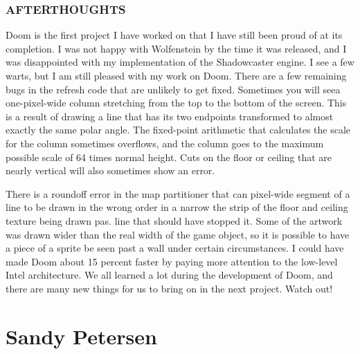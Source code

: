 \subsubsection{AFTERTHOUGHTS}
Doom is the first project I have worked on that I have still been proud of at its completion. I was not happy with Wolfenstein by the time it was released, and I was disappointed with my implementation of the Shadowcaster engine. I see a few warts, but I am still pleased with my work on Doom. There are a few remaining bugs in the refresh code that are unlikely to get fixed. Sometimes you will seea one-pixel-wide column stretching from the top to the bottom of the screen. This is a result of drawing a line that has its two endpoints transformed to almost exactly the same polar angle. The fixed-point arithmetic that calculates the scale for the column sometimes overflows, and the column goes to the maximum possible scale of 64 times normal height. Cuts on the floor or ceiling that are nearly vertical will also sometimes show an error.\\
\par

There is a roundoff error in the map partitioner that can pixel-wide segment of a line to be drawn in the wrong order in a narrow the strip of the floor and ceiling texture being drawn pas.
line that should have stopped it. Some of the artwork was drawn wider than the real width of the game object, so it is possible to have a piece of a sprite be seen past a wall under certain circumstances. I could have made Doom about 15 percent faster by paying more attention to the low-level Intel architecture. We all learned a lot during the development of Doom, and there are many new things for us to bring on in the next project. Watch out!





\section{Sandy Petersen}


